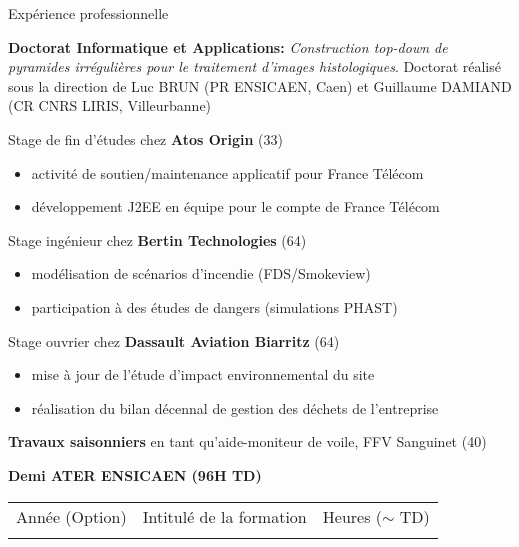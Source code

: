 \begin{rubric}{Expérience professionnelle}


  \textbf{Doctorat Informatique et Applications:}
  \textit{Construction top-down de pyramides irrégulières pour le traitement d'images histologiques}. 
  Doctorat réalisé sous la direction de Luc BRUN (PR ENSICAEN, Caen) et Guillaume DAMIAND
  (CR CNRS LIRIS, Villeurbanne)
  
  Stage de fin d'études chez \textbf{Atos Origin} (33)
  \begin{itemize}
  \item activité de soutien/maintenance applicatif pour France Télécom
  \item développement J2EE en équipe pour le compte de France Télécom
  \end{itemize}
  
  Stage ingénieur chez \textbf{Bertin Technologies} (64)
  \begin{itemize}
  \item modélisation de scénarios d'incendie (FDS/Smokeview)
  \item participation à des études de dangers (simulations PHAST)
  \end{itemize}
  
  Stage ouvrier chez \textbf{Dassault Aviation Biarritz} (64)
  \begin{itemize}
  \item mise à jour de l'étude d'impact environnemental du site
  \item réalisation du bilan décennal de gestion des déchets de l'entreprise
  \end{itemize}
  
  \textbf{Travaux saisonniers} en tant qu'aide-moniteur de voile, FFV Sanguinet (40)

  \newpage
  
  \textbf{Demi ATER ENSICAEN (96H TD)}
  \begin{flushleft}
    \begin{small}
      \begin{tabular}{l l r}
        \hline\noalign{\smallskip}
        Année (Option)   & Intitulé de la formation & Heures ($\sim$ TD) \\
        \noalign{\smallskip}\hline\noalign{\smallskip}
        

\end{tabular}
\end{small}
\end{flushleft}
\end{rubric}

